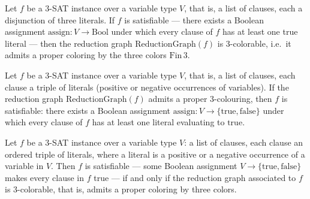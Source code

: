 \begin{lemma}
\label{SATtoColor.SATtoColorCompleteness}
\leanok
{}
Let $f$ be a 3-SAT instance over a variable type $V$, that is, a list of clauses, each a
disjunction of three literals. If $f$ is satisfiable — there exists a Boolean assignment
$\mathrm{assign} : V \to \mathrm{Bool}$ under which every clause of $f$ has at least one
true literal — then the reduction graph $\mathrm{ReductionGraph}(f)$ is 3-colorable,
i.e.\ it admits a proper coloring by the three colors $\mathrm{Fin}\,3$.
\end{lemma}

\begin{lemma}
\label{SATtoColor.SATtoColorSoundness}
\leanok
{}
Let $f$ be a 3-SAT instance over a variable type $V$, that is, a list of clauses, each
clause a triple of literals (positive or negative occurrences of variables). If the
reduction graph $\mathrm{ReductionGraph}(f)$ admits a proper $3$-colouring, then $f$ is
satisfiable: there exists a Boolean assignment $\mathrm{assign} \colon V \to
\{\mathrm{true}, \mathrm{false}\}$ under which every clause of $f$ has at least one
literal evaluating to $\mathrm{true}$.
\end{lemma}

\begin{theorem}
\label{SATtoColor.SATtoColorReduction}
\leanok
{}
Let $f$ be a 3-SAT instance over a variable type $V$: a list of clauses, each clause an
ordered triple of literals, where a literal is a positive or a negative occurrence of a
variable in $V$. Then $f$ is satisfiable — some Boolean assignment $V \to
\{\mathrm{true}, \mathrm{false}\}$ makes every clause in $f$ true — if and only if the
reduction graph associated to $f$ is 3-colorable, that is, admits a proper coloring by
three colors.
\end{theorem}

